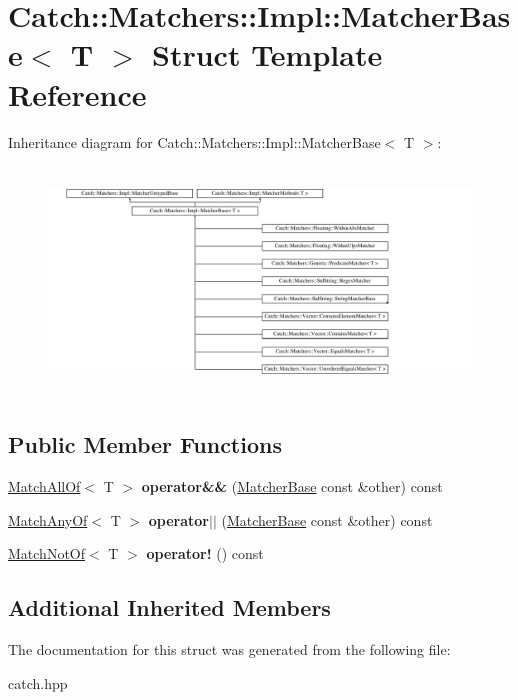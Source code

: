 \hypertarget{struct_catch_1_1_matchers_1_1_impl_1_1_matcher_base}{}\section{Catch\+:\+:Matchers\+:\+:Impl\+:\+:Matcher\+Base$<$ T $>$ Struct Template Reference}
\label{struct_catch_1_1_matchers_1_1_impl_1_1_matcher_base}
Inheritance diagram for Catch\+:\+:Matchers\+:\+:Impl\+:\+:Matcher\+Base$<$ T $>$\+:\begin{figure}[H]
\begin{center}
\leavevmode
\includegraphics[height=6.092978cm]{struct_catch_1_1_matchers_1_1_impl_1_1_matcher_base}
\end{center}
\end{figure}
\subsection*{Public Member Functions}
\begin{DoxyCompactItemize}
\item 
\mbox{\label{struct_catch_1_1_matchers_1_1_impl_1_1_matcher_base_a23c336f6d9457735ddc8dc7ea864d7c9}} 
\mbox{\hyperlink{struct_catch_1_1_matchers_1_1_impl_1_1_match_all_of}{Match\+All\+Of}}$<$ T $>$ {\bfseries operator\&\&} (\mbox{\hyperlink{struct_catch_1_1_matchers_1_1_impl_1_1_matcher_base}{Matcher\+Base}} const \&other) const
\item 
\mbox{\label{struct_catch_1_1_matchers_1_1_impl_1_1_matcher_base_a5f8542b8f1567a6f9c65d0a6da7b679b}} 
\mbox{\hyperlink{struct_catch_1_1_matchers_1_1_impl_1_1_match_any_of}{Match\+Any\+Of}}$<$ T $>$ {\bfseries operator$\vert$$\vert$} (\mbox{\hyperlink{struct_catch_1_1_matchers_1_1_impl_1_1_matcher_base}{Matcher\+Base}} const \&other) const
\item 
\mbox{\label{struct_catch_1_1_matchers_1_1_impl_1_1_matcher_base_a5bb94bf2ff5c7ef73b7c11eb173bdf3b}} 
\mbox{\hyperlink{struct_catch_1_1_matchers_1_1_impl_1_1_match_not_of}{Match\+Not\+Of}}$<$ T $>$ {\bfseries operator!} () const
\end{DoxyCompactItemize}
\subsection*{Additional Inherited Members}


The documentation for this struct was generated from the following file\+:\begin{DoxyCompactItemize}
\item 
catch.\+hpp\end{DoxyCompactItemize}
